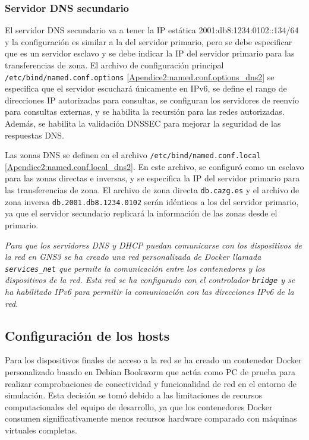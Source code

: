 \subsubsection*{Servidor DNS secundario}
El servidor DNS secundario va a tener la IP estática 2001:db8:1234:0102::134/64 y la configuración es similar a la del servidor primario, pero se debe especificar que es un servidor esclavo y se debe indicar la IP del servidor primario para las transferencias de zona. El archivo de configuración principal \texttt{/etc/bind/named.conf.options} \ref{Apendice2:named.conf.options_dns2} se especifica que el servidor escuchará únicamente en IPv6, se define el rango de direcciones IP autorizadas para consultas, se configuran los servidores de reenvío para consultas externas, y se habilita la recursión para las redes autorizadas. Además, se habilita la validación DNSSEC para mejorar la seguridad de las respuestas DNS.

\vspace{0.5cm}
Las zonas DNS se definen en el archivo \texttt{/etc/bind/named.conf.local} \ref{Apendice2:named.conf.local_dns2}. En este archivo, se configuró como un esclavo para las zonas directas e inversas, y se especifica la IP del servidor primario para las transferencias de zona. El archivo de zona directa \texttt{db.cazg.es} y el archivo de zona inversa \texttt{db.2001.db8.1234.0102} serán idénticos a los del servidor primario, ya que el servidor secundario replicará la información de las zonas desde el primario.

\vspace{0.3cm}
\begin{tcolorbox}[colback=gray!10!white, colframe=gray!70!black, title=NOTA:, size=title]
	\textit{Para que los servidores DNS y DHCP puedan comunicarse con los dispositivos de la red en GNS3 se ha creado una red personalizada de Docker llamada \texttt{services\_net} que permite la comunicación entre los contenedores y los dispositivos de la red. Esta red se ha configurado con el controlador \texttt{bridge} y se ha habilitado IPv6 para permitir la comunicación con las direcciones IPv6 de la red.}
\end{tcolorbox}

\subsection{Configuración de los hosts}
Para los dispositivos finales de acceso a la red se ha creado un contenedor Docker personalizado basado en Debian Bookworm \cite{debian_bookworm} que actúa como PC de
prueba para realizar comprobaciones de conectividad y funcionalidad de red en el entorno de simulación. Esta decisión se tomó debido a las limitaciones
de recursos computacionales del equipo de desarrollo, ya que los contenedores Docker consumen significativamente menos recursos hardware comparado
con máquinas virtuales completas.

